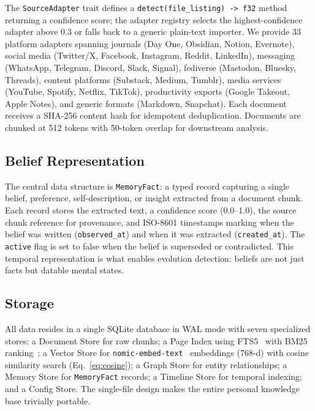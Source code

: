 \documentclass[conference]{IEEEtran}
\begin{document}
The \texttt{SourceAdapter} trait defines a \texttt{detect(file\_listing) -> f32} method returning a confidence score; the adapter registry selects the highest-confidence adapter above 0.3 or falls back to a generic plain-text importer. We provide 33 platform adapters spanning journals (Day One, Obsidian, Notion, Evernote), social media (Twitter/X, Facebook, Instagram, Reddit, LinkedIn), messaging (WhatsApp, Telegram, Discord, Slack, Signal), fediverse (Mastodon, Bluesky, Threads), content platforms (Substack, Medium, Tumblr), media services (YouTube, Spotify, Netflix, TikTok), productivity exports (Google Takeout, Apple Notes), and generic formats (Markdown, Snapchat). Each document receives a SHA-256 content hash for idempotent deduplication. Documents are chunked at 512 tokens with 50-token overlap for downstream analysis.

\subsection{Belief Representation}

The central data structure is \texttt{MemoryFact}: a typed record capturing a single belief, preference, self-description, or insight extracted from a document chunk. Each record stores the extracted text, a confidence score (0.0--1.0), the source chunk reference for provenance, and ISO-8601 timestamps marking when the belief was written (\texttt{observed\_at}) and when it was extracted (\texttt{created\_at}). The \texttt{active} flag is set to false when the belief is superseded or contradicted. This temporal representation is what enables evolution detection: beliefs are not just facts but datable mental states.

\subsection{Storage}

All data resides in a single SQLite database in WAL mode with seven specialized stores: a Document Store for raw chunks; a Page Index using FTS5~\cite{sqlite2023fts5} with BM25 ranking~\cite{robertson2009bm25}; a Vector Store for \texttt{nomic-embed-text}~\cite{nussbaum2024nomic} embeddings (768-d) with cosine similarity search (Eq.~\ref{eq:cosine}); a Graph Store for entity relationships; a Memory Store for \texttt{MemoryFact} records; a Timeline Store for temporal indexing; and a Config Store. The single-file design makes the entire personal knowledge base trivially portable.
\end{document}
